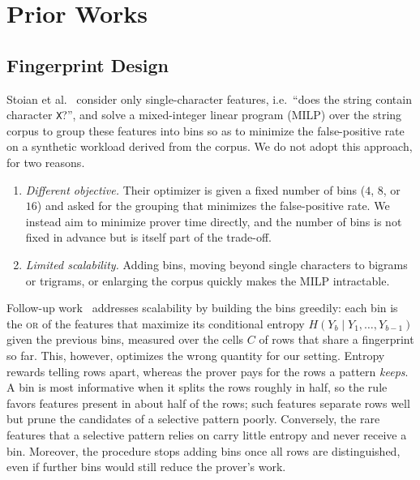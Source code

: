 \doclearpage
\section{Prior Works}
\label{sec:prior}
\subsection{Fingerprint Design}
\label{sec:fp-prior}
Stoian et al.~\cite{string_fingerprint} consider only single-character features, i.e.\ ``does the string contain character \texttt{X}?'', and solve a mixed-integer linear program (MILP) over the string corpus to group these features into bins so as to minimize the false-positive rate on a synthetic workload derived from the corpus. We do not adopt this approach, for two reasons.
\begin{enumerate}[label=(\alph*), nosep]
  \item \emph{Different objective.} Their optimizer is given a fixed number of bins ($4$, $8$, or $16$) and asked for the grouping that minimizes the false-positive rate. We instead aim to minimize prover time directly, and the number of bins is not fixed in advance but is itself part of the trade-off.
  \item \emph{Limited scalability.} Adding bins, moving beyond single characters to bigrams or trigrams, or enlarging the corpus quickly makes the MILP intractable.
\end{enumerate}

Follow-up work~\cite{string_fingerprint_entropy} addresses scalability by building the bins greedily: each bin is the \textsc{or} of the features that maximize its conditional entropy $H(Y_b \mid Y_1, \dots, Y_{b-1})$ given the previous bins, measured over the cells $C$ of rows that share a fingerprint so far. This, however, optimizes the wrong quantity for our setting. Entropy rewards telling rows apart, whereas the prover pays for the rows a pattern \emph{keeps}. A bin is most informative when it splits the rows roughly in half, so the rule favors features present in about half of the rows; such features separate rows well but prune the candidates of a selective pattern poorly. Conversely, the rare features that a selective pattern relies on carry little entropy and never receive a bin. Moreover, the procedure stops adding bins once all rows are distinguished, even if further bins would still reduce the prover's work.